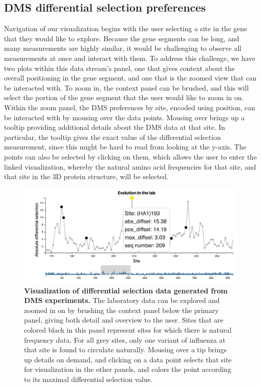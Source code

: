\documentclass[sigchi]{acmart}
\begin{document}
\subsection{DMS differential selection preferences}
Navigation of our visualization begins with the user selecting a site in the gene that they would like to explore.
Because the gene segments can be long, and many measurements are highly similar, it would be challenging to observe all measurements at once and interact with them.
To address this challenge, we have two plots within this data stream's panel, one that gives context about the overall positioning in the gene segment, and one that is the zoomed view that can be interacted with.
 To zoom in, the context panel can be brushed, and this will select the portion of the gene segment that the user would like to zoom in on.
Within the zoom panel, the DMS preferences by site, encoded using position, can be interacted with by mousing over the data points.
Mousing over brings up a tooltip providing additional details about the DMS data at that site.
In particular, the tooltip gives the exact value of the differential selection measurement, since this might be hard to read from looking at the y-axis.
The points can also be selected by clicking on them, which allows the user to enter the linked visualization, whereby the natural amino acid frequencies for that site, and that site in the 3D protein structure, will be selected.

\begin{figure}[H]
	\includegraphics[width=1.0\textwidth]{dms-brushed-tooltip.png}
	\caption{\textbf{Visualization of differential selection data generated from DMS experiments.}
  The laboratory data can be explored and zoomed in on by brushing the context panel below the primary panel, giving both detail and overview to the user.
Sites that are colored black in this panel represent sites for which there is natural frequency data.
For all grey sites, only one variant of influenza at that site is found to circulate naturally.
Mousing over a tip brings up details on demand, and clicking on a data point selects that site for visualization in the other panels, and colors the point according to its maximal differential selection value.
	}
	\label{dms-data}
\end{figure}
\end{document}
